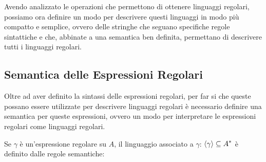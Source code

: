 Avendo analizzato le operazioni che permettono di ottenere linguaggi regolari, possiamo ora definire un modo per descrivere questi linguaggi in modo più compatto e semplice, ovvero delle stringhe che seguano specifiche regole sintattiche e che, abbinate a una semantica ben definita, permettano di descrivere tutti i linguaggi regolari.

\subsection{Semantica delle Espressioni Regolari}

Oltre ad aver definito la sintassi delle espressioni regolari, per far si che queste possano essere utilizzate per descrivere linguaggi regolari è necessario definire una semantica per queste espressioni, ovvero un modo per interpretare le espressioni regolari come linguaggi regolari.

Se \(\gamma\) è un'espressione regolare su \(A\), il linguaggio associato a \(\gamma\): \(\displaystyle{\left\langle{\gamma}\right\rangle} \subseteq A^*\) è definito dalle regole semantiche:

